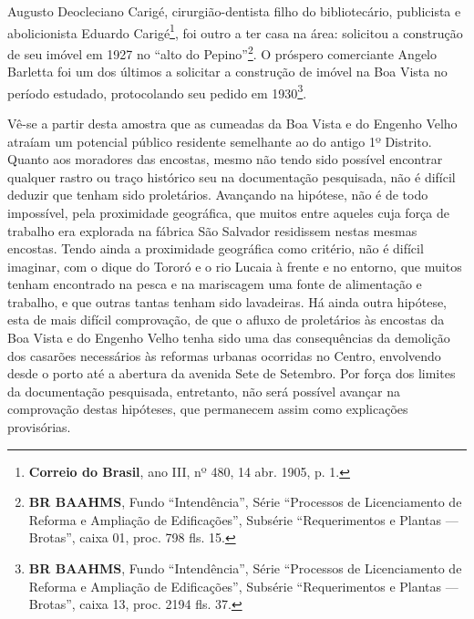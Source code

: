 Augusto Deocleciano Carigé, cirurgião-dentista filho do bibliotecário, publicista e abolicionista Eduardo Carigé\footnote{\textbf{Correio do Brasil}, ano III, nº 480, 14 abr. 1905, p. 1.}, foi outro a ter casa na área: solicitou a construção de seu imóvel em 1927 no ``alto do Pepino''\footnote{\textbf{BR BAAHMS}, Fundo ``Intendência'', Série ``Processos de Licenciamento de Reforma e Ampliação de Edificações'', Subsérie ``Requerimentos e Plantas --- Brotas'', caixa 01, proc. 798 fls. 15.}. O próspero comerciante Angelo Barletta foi um dos últimos a solicitar a construção de imóvel na Boa Vista no período estudado, protocolando seu pedido em 1930\footnote{\textbf{BR BAAHMS}, Fundo ``Intendência'', Série ``Processos de Licenciamento de Reforma e Ampliação de Edificações'', Subsérie ``Requerimentos e Plantas --- Brotas'', caixa 13, proc. 2194 fls. 37.}.

Vê-se a partir desta amostra que as cumeadas da Boa Vista e do Engenho Velho atraíam um potencial público residente semelhante ao do antigo 1º Distrito. Quanto aos moradores das encostas, mesmo não tendo sido possível encontrar qualquer rastro ou traço histórico seu na documentação pesquisada, não é difícil deduzir que tenham sido proletários. Avançando na hipótese, não é de todo impossível, pela proximidade geográfica, que muitos entre aqueles cuja força de trabalho era explorada na fábrica São Salvador residissem nestas mesmas encostas. Tendo ainda a proximidade geográfica como critério, não é difícil imaginar, com o dique do Tororó e o rio Lucaia à frente e no entorno, que muitos tenham encontrado na pesca e na mariscagem uma fonte de alimentação e trabalho, e que outras tantas tenham sido lavadeiras. Há ainda outra hipótese, esta de mais difícil comprovação, de que o afluxo de proletários às encostas da Boa Vista e do Engenho Velho tenha sido uma das consequências da demolição dos casarões necessários às reformas urbanas ocorridas no Centro, envolvendo desde o porto até a abertura da avenida Sete de Setembro. Por força dos limites da documentação pesquisada, entretanto, não será possível avançar na comprovação destas hipóteses, que permanecem assim como explicações provisórias.

